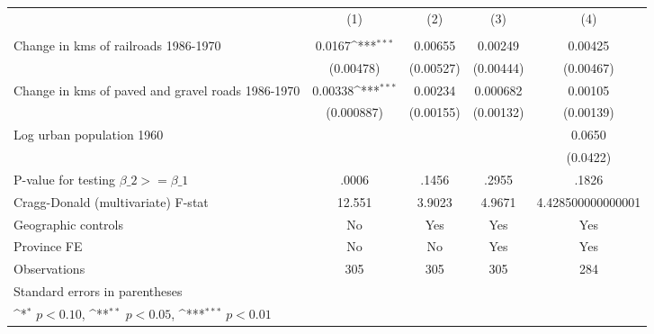 {
\def\sym#1{\ifmmode^{#1}\else\(^{#1}\)\fi}
\begin{tabular}{l*{4}{c}}
\hline\hline
                &\multicolumn{1}{c}{(1)}&\multicolumn{1}{c}{(2)}&\multicolumn{1}{c}{(3)}&\multicolumn{1}{c}{(4)}\\
                &\multicolumn{1}{c}{}&\multicolumn{1}{c}{}&\multicolumn{1}{c}{}&\multicolumn{1}{c}{}\\
\hline
Change in kms of railroads 1986-1970&   0.0167\sym{***}&  0.00655         &  0.00249         &  0.00425         \\
                &(0.00478)         &(0.00527)         &(0.00444)         &(0.00467)         \\
[1em]
Change in kms of paved and gravel roads 1986-1970&  0.00338\sym{***}&  0.00234         & 0.000682         &  0.00105         \\
                &(0.000887)         &(0.00155)         &(0.00132)         &(0.00139)         \\
[1em]
Log urban population 1960&                  &                  &                  &   0.0650         \\
                &                  &                  &                  & (0.0422)         \\
\hline
P-value for testing $\beta\_{2} >= \beta\_{1}$&    .0006         &    .1456         &    .2955         &    .1826         \\
Cragg-Donald (multivariate) F-stat&   12.551         &   3.9023         &   4.9671         &4.428500000000001         \\
Geographic controls&       No         &      Yes         &      Yes         &      Yes         \\
Province FE     &       No         &       No         &      Yes         &      Yes         \\
Observations    &      305         &      305         &      305         &      284         \\
\hline\hline
\multicolumn{5}{l}{\footnotesize Standard errors in parentheses}\\
\multicolumn{5}{l}{\footnotesize \sym{*} \(p<0.10\), \sym{**} \(p<0.05\), \sym{***} \(p<0.01\)}\\
\end{tabular}
}
